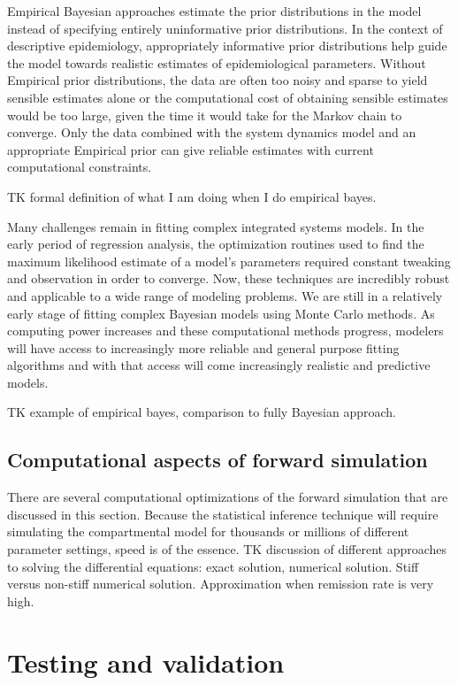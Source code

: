 Empirical Bayesian approaches estimate the prior distributions in the
model instead of specifying entirely uninformative prior
distributions. In the context of descriptive epidemiology,
appropriately informative prior distributions help guide the model
towards realistic estimates of epidemiological parameters. Without
Empirical prior distributions, the data are often too noisy and sparse
to yield sensible estimates alone or the computational cost of
obtaining sensible estimates would be too large, given the time it
would take for the Markov chain to converge. Only the data combined
with the system dynamics model and an appropriate Empirical prior can
give reliable estimates with current computational constraints.

TK formal definition of what I am doing when I do empirical bayes.

Many challenges remain in fitting complex integrated systems
models. In the early period of regression analysis, the optimization
routines used to find the maximum likelihood estimate of a model's
parameters required constant tweaking and observation in order to
converge. Now, these techniques are incredibly robust and applicable
to a wide range of modeling problems. We are still in a relatively
early stage of fitting complex Bayesian models using Monte Carlo
methods. As computing power increases and these computational methods
progress, modelers will have access to increasingly more reliable and
general purpose fitting algorithms and with that access will come
increasingly realistic and predictive models.

TK example of empirical bayes, comparison to fully Bayesian approach.

\subsection{Computational aspects of forward simulation}
There are several computational optimizations of the forward
simulation that are discussed in this section.  Because the
statistical inference technique will require simulating the
compartmental model for thousands or millions of different parameter
settings, speed is of the essence.  TK discussion of different
approaches to solving the differential equations: exact solution,
numerical solution. Stiff versus non-stiff numerical
solution. Approximation when remission rate is very high.

\section{Testing and validation}

